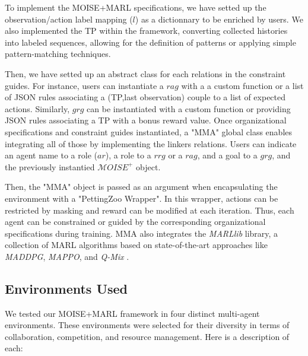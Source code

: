 \documentclass[sigconf,anonymous]{aamas}
\begin{document}
To implement the MOISE+MARL specifications, we have setted up the observation/action label mapping ($l$) as a dictionnary to be enriched by users. We also implemented the TP within the framework, converting collected histories into labeled sequences, allowing for the definition of patterns or applying simple pattern-matching techniques.

Then, we have setted up an abstract class for each relations in the constraint guides. For instance, users can instantiate a $rag$ with a a custom function or a list of JSON rules associating a (TP,last observation) couple to a list of expected actions. Similarly, $grg$ can be instantiated with a custom function or providing JSON rules associating a TP with a bonus reward value.
%
Once organizational specifications and constraint guides instantiated, a "MMA" global class enables integrating all of those by implementing the linkers relations. Users can indicate an agent name to a role ($ar$), a role to a $rrg$ or a $rag$, and a goal to a $grg$, and the previously instantied $\mathcal{M}OISE^+$ object.

Then, the "MMA" object is passed as an argument when encapsulating the environment with a "PettingZoo Wrapper". In this wrapper, actions can be restricted by masking and reward can be modified at each iteration. Thus, each agent can be constrained or guided by the corresponding organizational specifications during training.
%
MMA also integrates the \textit{MARLlib} library, a collection of MARL algorithms based on state-of-the-art approaches like \textit{MADDPG}, \textit{MAPPO}, and \textit{Q-Mix} \cite{hu2021marlib}.


\subsection{Environments Used}

We tested our MOISE+MARL framework in four distinct multi-agent environments. These environments were selected for their diversity in terms of collaboration, competition, and resource management. Here is a description of each:
\end{document}
